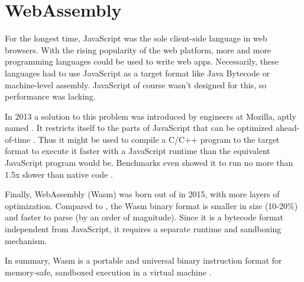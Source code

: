 \section{WebAssembly}


For the longest time, JavaScript was the sole client-side language in web browsers. With the rising popularity of the web platform, more and more programming languages could be used to write web apps. Necessarily, these languages had to use JavaScript as a target format like Java Bytecode or machine-level assembly. JavaScript of course wasn't designed for this, so performance was lacking.

In 2013 a solution to this problem was introduced by engineers at Mozilla, aptly named . It restricts itself to the parts of JavaScript that can be optimized ahead-of-time \cite{Herman2014}. Thus it might be used to compile a C/C++ program to the  target format to execute it faster with a JavaScript runtime than the equivalent JavaScript program would be. Benchmarks even showed it to run no more than 1.5x slower than native code \cite{Zakai2013}.

Finally, WebAssembly (Wasm) was born out of  in 2015, with more layers of optimization. Compared to , the Wasm binary format is smaller in size (10-20\%) and faster to parse (by an order of magnitude).
Since it is a bytecode format independent from JavaScript, it requires a separate runtime and sandboxing mechanism.

In summary, Wasm is a portable and universal binary instruction format for memory-safe, sandboxed execution in a virtual machine \cite{W3C2020}.
